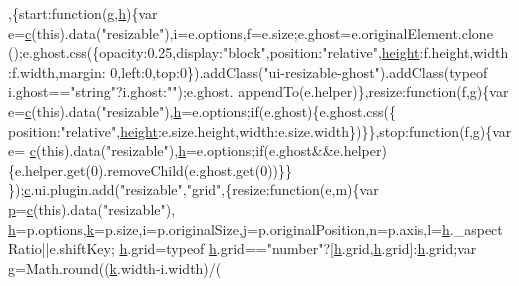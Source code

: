 \begin{DoxyCode}
      ,\{start:\textcolor{keyword}{function}(g,\hyperlink{all__1a_8js_aebecdaf2444e2be39f4804412d6a3bf8}{h})\{var e=\hyperlink{jquery_8js_ad171626e81625b5e9f5cb177a3a8fb1c}{c}(\textcolor{keyword}{this}).data(\textcolor{stringliteral}{"resizable"}),i=e.options,f=e.size;e.ghost=e.originalElement.clone
      ();e.ghost.css(\{opacity:0.25,display:\textcolor{stringliteral}{"block"},position:\textcolor{stringliteral}{"relative"},\hyperlink{styr_2styr_2main_8c_a48083b65ac9a863566dc3e3fff09a5b4}{height}:f.height,width:f.width,margin:
      0,left:0,top:0\}).addClass(\textcolor{stringliteral}{"ui-resizable-ghost"}).addClass(typeof i.ghost==\textcolor{stringliteral}{"string"}?i.ghost:\textcolor{stringliteral}{""});e.ghost.
      appendTo(e.helper)\},resize:\textcolor{keyword}{function}(f,g)\{var e=\hyperlink{jquery_8js_ad171626e81625b5e9f5cb177a3a8fb1c}{c}(\textcolor{keyword}{this}).data(\textcolor{stringliteral}{"resizable"}),\hyperlink{all__1a_8js_aebecdaf2444e2be39f4804412d6a3bf8}{h}=e.options;\textcolor{keywordflow}{if}(e.ghost)\{e.ghost.css(\{
      position:\textcolor{stringliteral}{"relative"},\hyperlink{styr_2styr_2main_8c_a48083b65ac9a863566dc3e3fff09a5b4}{height}:e.size.height,width:e.size.width\})\}\},stop:\textcolor{keyword}{function}(f,g)\{var e=
      \hyperlink{jquery_8js_ad171626e81625b5e9f5cb177a3a8fb1c}{c}(\textcolor{keyword}{this}).data(\textcolor{stringliteral}{"resizable"}),\hyperlink{all__1a_8js_aebecdaf2444e2be39f4804412d6a3bf8}{h}=e.options;\textcolor{keywordflow}{if}(e.ghost&&e.helper)\{e.helper.get(0).removeChild(e.ghost.get(0))\}\}
      \});\hyperlink{jquery_8js_ad171626e81625b5e9f5cb177a3a8fb1c}{c}.ui.plugin.add(\textcolor{stringliteral}{"resizable"},\textcolor{stringliteral}{"grid"},\{resize:\textcolor{keyword}{function}(e,m)\{var \hyperlink{jquery_8js_a2335e57f79b6acfb6de59c235dc8a83e}{p}=\hyperlink{jquery_8js_ad171626e81625b5e9f5cb177a3a8fb1c}{c}(\textcolor{keyword}{this}).data(\textcolor{stringliteral}{"resizable"}),
      \hyperlink{all__1a_8js_aebecdaf2444e2be39f4804412d6a3bf8}{h}=p.options,\hyperlink{jquery_8js_ab26645c014aa005ecedef329ecf58c99}{k}=p.size,i=p.originalSize,j=p.originalPosition,n=p.axis,l=\hyperlink{all__1a_8js_aebecdaf2444e2be39f4804412d6a3bf8}{h}.\_aspectRatio||e.shiftKey;
      \hyperlink{all__1a_8js_aebecdaf2444e2be39f4804412d6a3bf8}{h}.grid=typeof \hyperlink{all__1a_8js_aebecdaf2444e2be39f4804412d6a3bf8}{h}.grid==\textcolor{stringliteral}{"number"}?[\hyperlink{all__1a_8js_aebecdaf2444e2be39f4804412d6a3bf8}{h}.grid,\hyperlink{all__1a_8js_aebecdaf2444e2be39f4804412d6a3bf8}{h}.grid]:\hyperlink{all__1a_8js_aebecdaf2444e2be39f4804412d6a3bf8}{h}.grid;var g=Math.round((\hyperlink{jquery_8js_ab26645c014aa005ecedef329ecf58c99}{k}.width-i.width)/(

\end{DoxyCode}
